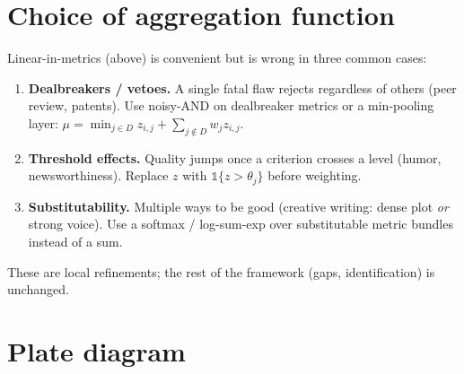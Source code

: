 \documentclass[11pt]{article}
\begin{document}
\section{Choice of aggregation function}

Linear-in-metrics (above) is convenient but is wrong in three common cases:

\begin{enumerate}[topsep=2pt,itemsep=2pt]
\item \textbf{Dealbreakers / vetoes.} A single fatal flaw rejects regardless of others
      (peer review, patents). Use noisy-AND on dealbreaker metrics or a min-pooling layer:
      $\mu = \min_{j \in D} z_{i,j} + \sum_{j\notin D} w_j z_{i,j}$.
\item \textbf{Threshold effects.} Quality jumps once a criterion crosses a level (humor,
      newsworthiness). Replace $z$ with $\mathbb{1}\{z > \theta_j\}$ before weighting.
\item \textbf{Substitutability.} Multiple ways to be good (creative writing: dense plot
      \emph{or} strong voice). Use a softmax / log-sum-exp over substitutable metric
      bundles instead of a sum.
\end{enumerate}

These are local refinements; the rest of the framework (gaps, identification) is unchanged.

\section{Plate diagram}
\end{document}
